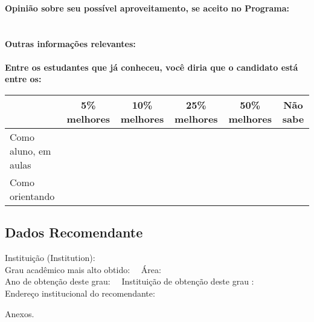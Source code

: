 \documentclass[11pt]{article}
\begin{document}
\\\\
\\
\textbf{Opinião sobre seu possível aproveitamento, se aceito no Programa:}
\\\\ 
\\
\textbf{Outras informações relevantes:} \\
\\[0.3cm]
\textbf{Entre os estudantes que já conheceu, você diria que o candidato está entre os:}
\\
\begin{tabular}{|l|c|c|c|c|c|}
\hline
 & 5\% melhores & 10\% melhores & 25\% melhores & 50\% melhores & Não sabe \\
\hline
Como aluno, em aulas &  &  &  &  & \\
\hline
Como orientando &  &  &  &  & \\
\hline
\end{tabular}
\subsection*{Dados Recomendante} 
	Instituição (Institution): 
\\ 
	Grau acadêmico mais alto obtido: 
	\ \ Área: 
	\\
	Ano de obtenção deste grau: 
	\ \ 
	Instituição de obtenção deste grau : 
	\\ 
	Endereço institucional do recomendante: \\  
\begin{center}
Anexos.
\end{center}
\end{document}
